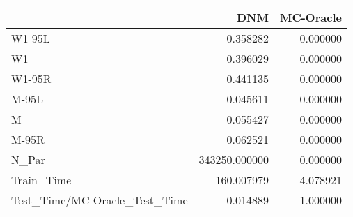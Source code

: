 \begin{tabular}{lrr}
\toprule
{} &            DNM &  MC-Oracle \\
\midrule
W1-95L                        &       0.358282 &   0.000000 \\
W1                            &       0.396029 &   0.000000 \\
W1-95R                        &       0.441135 &   0.000000 \\
M-95L                         &       0.045611 &   0.000000 \\
M                             &       0.055427 &   0.000000 \\
M-95R                         &       0.062521 &   0.000000 \\
N\_Par                         &  343250.000000 &   0.000000 \\
Train\_Time                    &     160.007979 &   4.078921 \\
Test\_Time/MC-Oracle\_Test\_Time &       0.014889 &   1.000000 \\
\bottomrule
\end{tabular}
